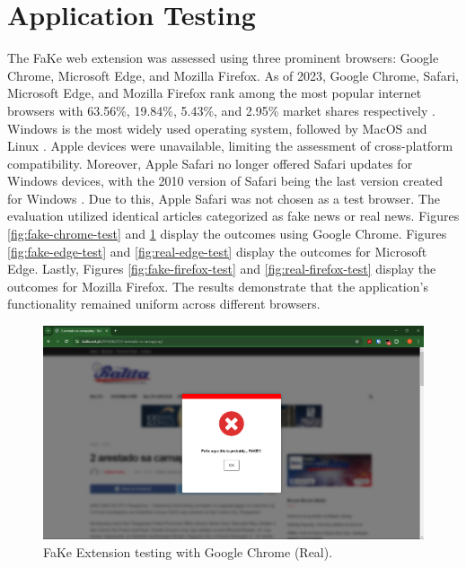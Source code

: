 \section{Application Testing}
The FaKe web extension was assessed using three prominent browsers: Google Chrome, Microsoft Edge, and Mozilla Firefox. As of 2023,
Google Chrome, Safari, Microsoft Edge, and Mozilla Firefox rank among the most popular internet browsers with 63.56\%, 19.84\%,
5.43\%, and 2.95\%  market shares respectively \cite{statista2024}. Windows is the most widely used operating system, followed by
MacOS and Linux \cite{idris2021}. Apple devices were unavailable, limiting the assessment of cross-platform compatibility.
Moreover, Apple Safari no longer offered Safari updates for Windows devices, with the 2010 version of Safari being the last
version created for Windows \cite{apple2024}. Due to this, Apple Safari was not chosen as a test browser. The evaluation utilized identical articles categorized as fake news or real news. Figures \ref{fig:fake-chrome-test} and \ref{fig:real-chrome-test} display the outcomes using Google Chrome. Figures \ref{fig:fake-edge-test} and \ref{fig:real-edge-test} display the outcomes for Microsoft Edge. Lastly, Figures \ref{fig:fake-firefox-test} and \ref{fig:real-firefox-test} display the outcomes for Mozilla Firefox. The results demonstrate that the application's functionality remained uniform across different browsers.

        \begin{figure}[h!]
            \centering
            \includegraphics[width=1\textwidth,height=1\textheight, keepaspectratio]{figures/Screenshots/chrome-true-positive.png}
            \caption{FaKe Extension testing with Google Chrome (Real).}
            \label{fig:real-chrome-test}
        \end{figure}

